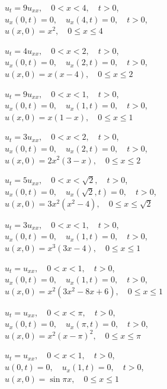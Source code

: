 \begin{exerciselist}
  \item\label{exer:12.1.17} \Cex $u_{t}=9u_{xx},\quad0<x<4,\quad t>0$,\\ $u_{x}(0,t)=0,\quad u_{x}(4,t)=0,\quad t>0$,\\ $u(x,0)=x^{2},\quad0\le x\le4$

  \item\label{exer:12.1.18} $u_{t}=4u_{xx},\quad0<x<2,\quad t>0$,\\ $u_{x}(0,t)=0,\quad u_{x}(2,t)=0,\quad t>0$,\\ $u(x,0)=x(x-4),\quad0\le x\le2$

  \item\label{exer:12.1.19} \Cex $u_{t}=9u_{xx},\quad0<x<1,\quad t>0$,\\ $u_{x}(0,t)=0,\quad u_{x}(1,t)=0,\quad t>0$,\\ $u(x,0)=x(1-x),\quad0\le x\le1$

  \item\label{exer:12.1.20} $u_{t}=3u_{xx},\quad0<x<2,\quad t>0$,\\ $u_{x}(0,t)=0,\quad u_{x}(2,t)=0,\quad t>0$,\\ $u(x,0)=2x^{2}(3-x),\quad0\le x\le2$

  \item\label{exer:12.1.21} $u_{t}=5u_{xx},\quad0<x<\sqrt{2},\quad t>0$,\\ $u_{x}(0,t)=0,\quad u_{x}(\sqrt{2},t)=0,\quad t>0$,\\ $u(x,0)=3x^{2}(x^{2}-4),\quad0\le x\le\sqrt{2}$

  \item\label{exer:12.1.22} \Cex $u_{t}=3u_{xx},\quad0<x<1,\quad t>0$,\\ $u_{x}(0,t)=0,\quad u_{x}(1,t)=0,\quad t>0$,\\ $u(x,0)=x^{3}(3x-4),\quad0\le x\le1$

  \item\label{exer:12.1.23} $u_{t}=u_{xx},\quad0<x<1,\quad t>0$,\\ $u_{x}(0,t)=0,\quad u_{x}(1,t)=0,\quad t>0$,\\ $u(x,0)=x^{2}(3x^{2}-8x+6),\quad0\le x\le1$

  \item\label{exer:12.1.24} $u_{t}=u_{xx},\quad0<x<\pi,\quad t>0$,\\ $u_{x}(0,t)=0,\quad u_{x}(\pi,t)=0,\quad t>0$,\\ $u(x,0)=x^{2}(x-\pi)^{2},\quad0\le x\le\pi$

  \item\label{exer:12.1.25} $u_{t}=u_{xx},\quad0<x<1,\quad t>0$,\\ $u(0,t)=0,\quad u_{x}(1,t)=0,\quad t>0$,\\ $u(x,0)=\sin\pi x,\quad0\le x\le1$


\end{exerciselist}
